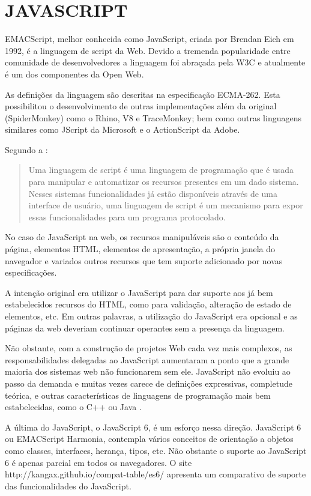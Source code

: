 \section{JAVASCRIPT}

EMACScript, melhor conhecida como JavaScript, criada por Brendan Eich em
1992, é a linguagem de script da Web. Devido a tremenda popularidade
entre comunidade de desenvolvedores a linguagem foi abraçada pela W3C e
atualmente é um dos componentes da Open Web.

As definições da linguagem são descritas na especificação ECMA-262.
Esta possibilitou o desenvolvimento de outras implementações além da
original (SpiderMonkey) como o Rhino, V8 e TraceMonkey; bem como
outras linguagens similares como JScript da Microsoft e o ActionScript
da Adobe.

Segundo a \cite{ecmaSpecificaton}:
\begin{quote}
Uma linguagem de script é uma linguagem de programação que é
usada para manipular e automatizar os recursos presentes em um dado
sistema. Nesses sistemas funcionalidades já estão disponíveis
através de uma interface de usuário, uma linguagem de script é
um mecanismo para expor essas funcionalidades para um programa
protocolado.
\end{quote}

No caso de JavaScript na web, os recursos manipuláveis são o conteúdo
da página, elementos HTML, elementos de apresentação,
a própria janela do navegador e variados outros recursos que tem
suporte adicionado por novas especificações.

A intenção original era utilizar o JavaScript para dar suporte aos já
bem estabelecidos recursos do HTML, como para validação, alteração
de estado de elementos, etc. Em outras palavras, a utilização do
JavaScript era opcional e as páginas da web deveriam continuar
operantes sem a presença da linguagem.

Não obstante, com a construção de projetos Web cada vez mais complexos, as
responsabilidades delegadas ao JavaScript aumentaram a ponto que a
grande maioria dos sistemas web não funcionarem sem ele.
JavaScript não evoluiu ao passo da demanda e muitas vezes carece de
definições expressivas, completude teórica, e outras características
de linguagens de programação mais bem estabelecidas, como o C++ ou
Java \autocite{crossPlatformMobileGame}.

A última do JavaScript, o JavaScript 6, é um esforço nessa direção.
JavaScript 6 ou EMACScript Harmonia, contempla vários conceitos de
orientação a objetos como classes, interfaces, herança, tipos, etc.
Não obstante o suporte ao JavaScript 6 é apenas parcial em todos
os navegadores. O site http://kangax.github.io/compat-table/es6/
apresenta um comparativo de suporte das funcionalidades do JavaScript.

